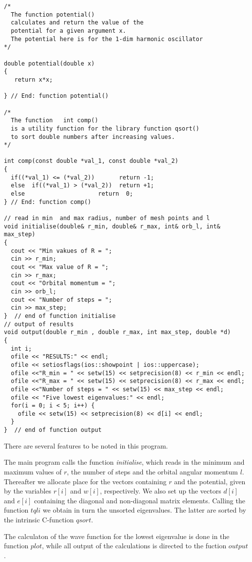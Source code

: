 \begin{lstlisting}[title={\url{http://folk.uio.no/compphys/programs/chapter07/cpp/program1.cpp}}]
/*
  The function potential()
  calculates and return the value of the 
  potential for a given argument x.
  The potential here is for the 1-dim harmonic oscillator
*/        

double potential(double x)
{
   return x*x;

} // End: function potential()  

/*
  The function   int comp()                  
  is a utility function for the library function qsort()
  to sort double numbers after increasing values.
*/       

int comp(const double *val_1, const double *val_2)
{
  if((*val_1) <= (*val_2))       return -1;
  else  if((*val_1) > (*val_2))  return +1;
  else                     return  0; 
} // End: function comp() 

// read in min  and max radius, number of mesh points and l
void initialise(double& r_min, double& r_max, int& orb_l, int& max_step) 
{
  cout << "Min vakues of R = ";
  cin >> r_min;
  cout << "Max value of R = ";
  cin >> r_max;
  cout << "Orbital momentum = ";
  cin >> orb_l;
  cout << "Number of steps = ";
  cin >> max_step;
}  // end of function initialise   
// output of results
void output(double r_min , double r_max, int max_step, double *d)
{
  int i;
  ofile << "RESULTS:" << endl;
  ofile << setiosflags(ios::showpoint | ios::uppercase);
  ofile <<"R_min = " << setw(15) << setprecision(8) << r_min << endl;  
  ofile <<"R_max = " << setw(15) << setprecision(8) << r_max << endl;  
  ofile <<"Number of steps = " << setw(15) << max_step << endl;  
  ofile << "Five lowest eigenvalues:" << endl;
  for(i = 0; i < 5; i++) {
    ofile << setw(15) << setprecision(8) << d[i] << endl;
  }
}  // end of function output
\end{lstlisting}

There are several features to be noted in this program.

The main program calls the function {\em initialise}, which reads
in the minimum and maximum values of $r$, the number of steps
and the orbital angular momentum $l$. Thereafter we allocate place
for the vectors containing $r$ and the potential, given by the variables
$r[i]$ and $w[i]$, respectively.
We also set up the vectors $d[i]$ and $e[i]$ containing
the diagonal and non-diagonal matrix elements. Calling the function
$tqli$ we obtain in turn the unsorted eigenvalues. The latter are sorted 
by the intrinsic C-function $qsort$. 

The calculaton of the wave function for the lowest eigenvalue is done
in the function $plot$, while all output of the calculations
is directed to the fuction $output$.


